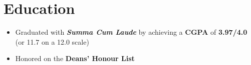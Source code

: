 \documentclass[12pt,letterpaper,sans]{moderncv}        %
\begin{document}
\makecvtitle


\vspace{-2.5em}


\section{Education}
\vspace{-0.75em}
\begin{small}
  \begin{itemize}
    \item Graduated with \textbf{\textit{Summa Cum Laude}} by achieving a \textbf{CGPA} of \textbf{3.97/4.0} (or 11.7 on a 12.0 scale)
    \item Honored on the \textbf{Deans' Honour List}
  \end{itemize}
\end{small}


\end{document}
